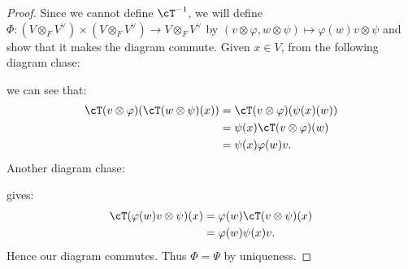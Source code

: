         \begin{proof}
            Since we cannot define $\cT^{-1}$, we will define $\Phi: (V \otimes_F V^\vee) \times (V \otimes_F V^\vee) \rightarrow V \otimes_F V^\vee$ by $(v \otimes \varphi, w \otimes \psi) \mapsto \varphi(w)v \otimes \psi$ and show that it makes the diagram commute. Given $x \in V$, from the following diagram chase:
                \begin{center}
                \end{center}
            we can see that:
                \begin{equation*}
                \begin{split}
                    \cT(v \otimes \varphi)(\cT(w \otimes \psi)(x))
                    & = \cT(v \otimes \varphi)(\psi(x)(w)) \\
                    & = \psi(x)\cT(v \otimes \varphi)(w) \\
                    & = \psi(x)\varphi(w)v.
                \end{split}
                \end{equation*}
            Another diagram chase:
                \begin{center}
                \end{center}
            gives:
                \begin{equation*}
                \begin{split}
                    \cT(\varphi(w)v \otimes \psi)(x)
                    & = \varphi(w)\cT(v \otimes \psi)(x) \\
                    & = \varphi(w)\psi(x)v.
                \end{split}
                \end{equation*}
            Hence our diagram commutes. Thus $\Phi = \Psi$ by uniqueness.
        \end{proof}


